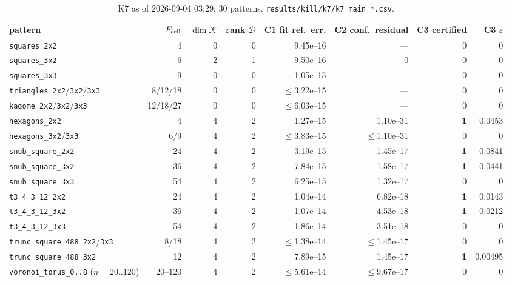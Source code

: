 \documentclass[10pt,a4paper]{article}
\newcommand{\fn}[1]{\nolinkurl{#1}}
\begin{document}
\begin{table}[h]\centering\footnotesize
\begin{tabular}{@{}lrrrrrrr@{}}
\toprule
pattern & $F_{\rm cell}$ & $\dim\mathcal K$ & rank $\mathcal D$ & C1 fit rel.\ err. & C2 conf.\ residual & C3 certified & C3 $\varepsilon$ \\
\midrule
\fn{squares_2x2} & 4 & 0 & 0 & 9.45e--16 & --- & 0 & 0 \\
\fn{squares_3x2} & 6 & 2 & 1 & 9.50e--16 & 0 & 0 & 0 \\
\fn{squares_3x3} & 9 & 0 & 0 & 1.05e--15 & --- & 0 & 0 \\
\fn{triangles_2x2}/\fn{3x2}/\fn{3x3} & 8/12/18 & 0 & 0 & $\le$3.22e--15 & --- & 0 & 0 \\
\fn{kagome_2x2}/\fn{3x2}/\fn{3x3} & 12/18/27 & 0 & 0 & $\le$6.03e--15 & --- & 0 & 0 \\
\fn{hexagons_2x2} & 4 & 4 & 2 & 1.27e--15 & 1.10e--31 & \textbf{1} & 0.0453 \\
\fn{hexagons_3x2}/\fn{3x3} & 6/9 & 4 & 2 & $\le$3.83e--15 & $\le$1.10e--31 & 0 & 0 \\
\fn{snub_square_2x2} & 24 & 4 & 2 & 3.19e--15 & 1.45e--17 & \textbf{1} & 0.0841 \\
\fn{snub_square_3x2} & 36 & 4 & 2 & 7.84e--15 & 1.58e--17 & \textbf{1} & 0.0441 \\
\fn{snub_square_3x3} & 54 & 4 & 2 & 6.25e--15 & 1.32e--17 & 0 & 0 \\
\fn{t3_4_3_12_2x2} & 24 & 4 & 2 & 1.04e--14 & 6.82e--18 & \textbf{1} & 0.0143 \\
\fn{t3_4_3_12_3x2} & 36 & 4 & 2 & 1.07e--14 & 4.53e--18 & \textbf{1} & 0.0212 \\
\fn{t3_4_3_12_3x3} & 54 & 4 & 2 & 1.86e--14 & 3.51e--18 & 0 & 0 \\
\fn{trunc_square_488_2x2}/\fn{3x3} & 8/18 & 4 & 2 & $\le$1.38e--14 & $\le$1.45e--17 & 0 & 0 \\
\fn{trunc_square_488_3x2} & 12 & 4 & 2 & 7.89e--15 & 1.45e--17 & \textbf{1} & 0.00495 \\
\fn{voronoi_torus_0..8} ($n=20..120$) & 20--120 & 4 & 2 & $\le$5.61e--14 & $\le$9.67e--17 & 0 & 0 \\
\bottomrule
\end{tabular}
\caption{K7 as of 2026-09-04 03:29: 30 patterns. \fn{results/kill/k7/k7_main_*.csv}.}
\end{table}
\end{document}
